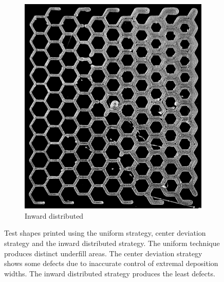 \begin{figure}
\begin{subfigure}{\figwidth}
\includegraphics[height=\figheight]{sources/applications/P3_print_hex_inward_edited.png}
\caption{Inward distributed}\label{print_inward}
\end{subfigure}
\caption{
Test shapes printed using the uniform strategy, center deviation strategy and the inward distributed strategy.
The uniform technique produces distinct underfill areas.
The center deviation strategy shows some defects due to inaccurate control of extremal deposition widths.
The inward distributed strategy produces the least defects.
}
\label{prints}
\end{figure}

